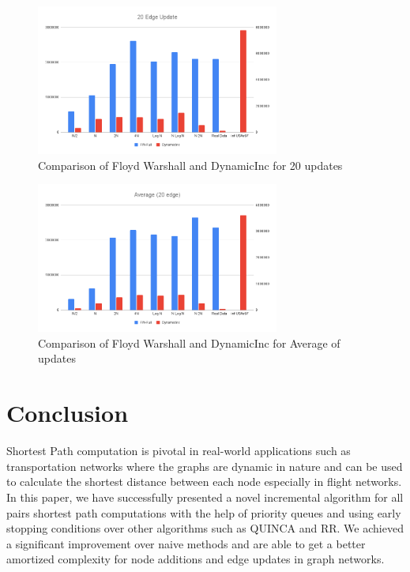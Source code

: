 \documentclass[conference]{IEEEtran}
\begin{document}
\begin{figure}[htp]
    \centering
    \includegraphics[width=8cm]{figures/20EdgeUpdate.png}
    \caption{Comparison of Floyd Warshall and DynamicInc for 20 updates}
    \label{fig:5edgeupdate}
\end{figure}

\begin{figure}[htp]
    \centering
    \includegraphics[width=8cm]{figures/Average.png}
    \caption{Comparison of Floyd Warshall and DynamicInc for Average of updates}
    \label{fig:5edgeupdate}
\end{figure}
\section{Conclusion}

Shortest Path computation is pivotal in real-world applications such as transportation networks where the graphs are dynamic in nature and can be used to calculate the shortest distance between each node especially in flight networks. In this paper, we have successfully presented a novel incremental algorithm for all pairs shortest path computations with the help of priority queues and using early stopping conditions over other algorithms such as QUINCA and RR. We achieved a significant improvement over naive methods and are able to get a better amortized complexity for node additions and edge updates in graph networks.
\end{document}
